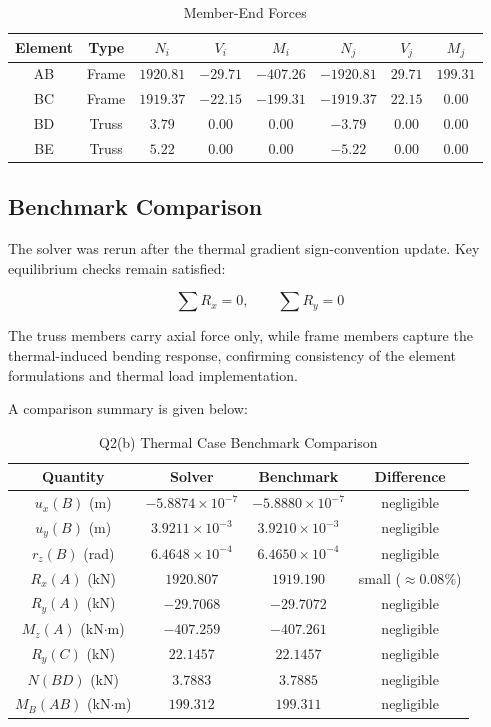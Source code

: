 \begin{table}[H]
\centering
\caption{Member-End Forces}
\begin{tabular}{cccccccc}
\toprule
Element & Type & $N_i$ & $V_i$ & $M_i$ & $N_j$ & $V_j$ & $M_j$ \\
\midrule
AB & Frame & $1920.81$ & $-29.71$ & $-407.26$ & $-1920.81$ & $29.71$ & $199.31$ \\
BC & Frame & $1919.37$ & $-22.15$ & $-199.31$ & $-1919.37$ & $22.15$ & $0.00$ \\
BD & Truss & $3.79$ & $0.00$ & $0.00$ & $-3.79$ & $0.00$ & $0.00$ \\
BE & Truss & $5.22$ & $0.00$ & $0.00$ & $-5.22$ & $0.00$ & $0.00$ \\
\bottomrule
\end{tabular}
\end{table}

\subsection{Benchmark Comparison}

The solver was rerun after the thermal gradient sign-convention update. Key equilibrium checks remain satisfied:

\[
\sum R_x = 0, \qquad \sum R_y = 0
\]

The truss members carry axial force only, while frame members capture the thermal-induced bending response, confirming consistency of the element formulations and thermal load implementation.

A comparison summary is given below:

\begin{table}[H]
\centering
\caption{Q2(b) Thermal Case Benchmark Comparison}
\label{tab:q2b_comparison}
\begin{tabular}{cccc}
\toprule
Quantity & Solver & Benchmark & Difference \\
\midrule
$u_x(B)$ (m) & $-5.8874\times10^{-7}$ & $-5.8880\times10^{-7}$ & negligible \\
$u_y(B)$ (m) & $3.9211\times10^{-3}$ & $3.9210\times10^{-3}$ & negligible \\
$r_z(B)$ (rad) & $6.4648\times10^{-4}$ & $6.4650\times10^{-4}$ & negligible \\
$R_x(A)$ (kN) & $1920.807$ & $1919.190$ & small ($\approx 0.08\%$) \\
$R_y(A)$ (kN) & $-29.7068$ & $-29.7072$ & negligible \\
$M_z(A)$ (kN$\cdot$m) & $-407.259$ & $-407.261$ & negligible \\
$R_y(C)$ (kN) & $22.1457$ & $22.1457$ & negligible \\
$N(BD)$ (kN) & $3.7883$ & $3.7885$ & negligible \\
$M_B(AB)$ (kN$\cdot$m) & $199.312$ & $199.311$ & negligible \\
\bottomrule
\end{tabular}
\end{table}

